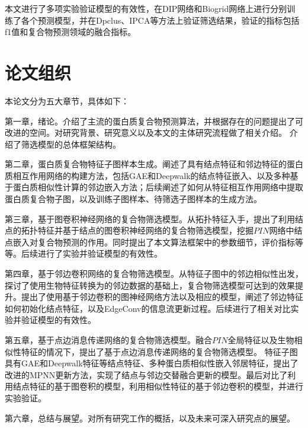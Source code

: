 本文进行了多项实验验证模型的有效性，在DIP网络和Biogrid网络上进行分别训练了各个预测模型，并在Dpclus、IPCA等方法上验证筛选结果，验证的指标包括f1值和复合物预测领域的融合指标。

\section{论文组织}
\label{section:intro:organization}

本论文分为五大章节，具体如下：

第一章，绪论。介绍了主流的蛋白质复合物预测算法，并根据存在的问题提出了可改进的空间。对研究背景、研究意义以及本文的主体研究流程做了相关介绍。
介绍了筛选模型的总体框架结构。

第二章，蛋白质复合物特征子图样本生成。阐述了具有结点特征和邻边特征的蛋白质相互作用网络的构建方法，包括GAE和Deepwalk的结点特征嵌入、以及多种基于蛋白质相似性计算的邻边嵌入方法；后续阐述了如何从特征相互作用网络中提取蛋白质复合物子图，以及训练子图样本、待筛选子图样本的生成方法。

第三章，基于图卷积神经网络的复合物筛选模型。从拓扑特征入手，提出了利用结点的拓扑特征并基于结点的图卷积神经网络的复合物筛选模型，挖掘$PIN$网络中结点嵌入对复合物预测的作用。同时提出了本文算法框架中的参数细节，评价指标等等。后续进行了实验并验证模型的有效性。

第四章，基于邻边卷积网络的复合物筛选模型。从特征子图中的邻边相似性出发，探讨了使用生物特征转换为的邻边数据的基础上，复合物筛选模型可达到的效果提升。提出了使用基于邻边卷积的图神经网络方法以及相应的模型，阐述了邻边特征如何初始化结点特征，以及EdgeConv的信息流更新过程。后续进行了相关对比实验并验证模型的有效性。

第五章，基于点边消息传递网络的复合物筛选模型。融合$PIN$全局特征以及生物相似性特征的情况下，提出了基于点边消息传递网络的复合物筛选模型。
特征子图具有GAE和Deepwalk特征等结点特征、多种蛋白质相似性嵌入邻居特征，提出了改进的MPNN更新方法，实现了结点与邻边交替融合更新的模型。最后对比了利用结点特征的基于图卷积的模型，利用相似性特征的基于邻边卷积的模型，并进行实验验证。

第六章，总结与展望。对所有研究工作的概括，以及未来可深入研究点的展望。